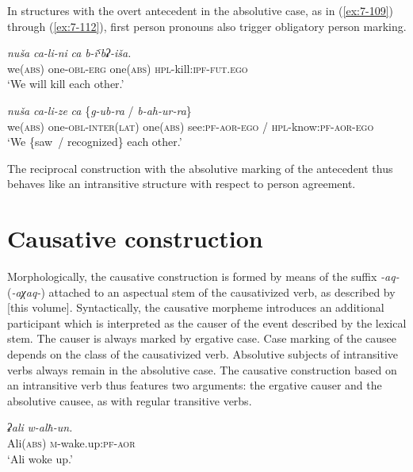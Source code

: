 ﻿\documentclass[output=paper]{langsci/langscibook}
\begin{document}
In structures with the overt antecedent in the absolutive case, as in
(\ref{ex:7-109}) through (\ref{ex:7-112}), first person pronouns also trigger obligatory
person marking.

\ea %
\gll \emph{nuša} \emph{ca-li-ni} \emph{ca} \emph{b-iˤbʡ-iša.}\\
we(\textsc{abs}) one-\textsc{obl}-\textsc{erg} one(\textsc{abs}) \textsc{hpl}-kill:\textsc{ipf}-\textsc{fut}.\textsc{ego}\\
\glt `We will kill each other.'

\ex %
\gll \emph{nuša} \emph{ca-li-ze} \emph{ca} \{\emph{g-ub-ra} / \emph{b-ah-ur-ra}\}\\
we(\textsc{abs}) one-\textsc{obl}-\textsc{inter(lat)} one(\textsc{abs}) see:\textsc{pf}-\textsc{aor}-\textsc{ego} / \textsc{hpl}-know:\textsc{pf}-\textsc{aor}-\textsc{ego}\\
\glt `We \{saw~/ recognized\} each other.'
\z

The reciprocal construction with the absolutive marking of the
antecedent thus behaves like an intransitive structure with respect to
person agreement.

\section[Causative construction]{Causative construction\protect\footnotemark}\label{Causative-construction}

Morphologically, the causative construction is formed by means of the
suffix \mbox{\emph{-aq-}} (\emph{-aχaq-}) attached to an aspectual stem of the
causativized verb, as described by \citet{daniel2019} [this volume]. Syntactically, the
causative morpheme introduces an additional participant which is
interpreted as the causer of the event described by the lexical stem.
The causer is always marked by ergative case. Case marking of the causee
depends on the class of the causativized verb. Absolutive subjects of
intransitive verbs always remain in the absolutive case. The causative
construction based on an intransitive verb thus features two arguments:
the ergative causer and the absolutive causee, as with regular
transitive verbs.

\ea %
\ea %
\gll \emph{ʡali} \emph{w-alħ-un.}\\
Ali(\textsc{abs}) \textsc{m}-wake.up:\textsc{pf}-\textsc{aor}\\
\glt `Ali woke up.'
\end{document}
